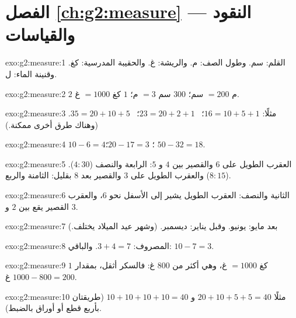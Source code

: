 \section*{الفصل \ref{ch:g2:measure} --- النقود والقياسات}

\begin{solution}{exo:g2:measure:1}
القلم: سم. وطول الصف: م. والريشة: غ. والحقيبة المدرسية: كغ.
وقنينة الماء: ل.
\end{solution}

\begin{solution}{exo:g2:measure:2}
$2$ م $= 200$ سم؛ \quad $300$ سم $= 3$ م؛ \quad $1$ كغ $= 1000$ غ.
\end{solution}

\begin{solution}{exo:g2:measure:3}
مثلًا: $16 = 10 + 5 + 1$؛ \ $23 = 20 + 2 + 1$؛ \
$35 = 20 + 10 + 5$. (وهناك طرق أخرى ممكنة.)
\end{solution}

\begin{solution}{exo:g2:measure:4}
$10 - 6 = 4$؛ \quad $20 - 17 = 3$؛ \quad $50 - 32 = 18$.
\end{solution}

\begin{solution}{exo:g2:measure:5}
العقرب الطويل على $6$ والقصير بين $4$ و $5$: الرابعة والنصف
($4{:}30$). والعقرب الطويل على $3$ والقصير بعد $8$ بقليل: الثامنة
والربع ($8{:}15$).
\end{solution}

\begin{solution}{exo:g2:measure:6}
الثانية والنصف: العقرب الطويل يشير إلى الأسفل نحو $6$، والعقرب
القصير يقع بين $2$ و $3$.
\end{solution}

\begin{solution}{exo:g2:measure:7}
بعد مايو: يونيو. وقبل يناير: ديسمبر. (وشهر عيد الميلاد يختلف.)
\end{solution}

\begin{solution}{exo:g2:measure:8}
المصروف: $3 + 4 = 7$. والباقي: $10 - 7 = 3$.
\end{solution}

\begin{solution}{exo:g2:measure:9}
$1$ كغ $= 1000$ غ، وهي أكثر من $800$ غ: فالسكر أثقل،
بمقدار $1000 - 800 = 200$ غ.
\end{solution}

\begin{solution}{exo:g2:measure:10}
مثلًا $20 + 10 + 5 + 5 = 40$ و $10 + 10 + 10 + 10 = 40$
(طريقتان بأربع قطع أو أوراق بالضبط).
\end{solution}
